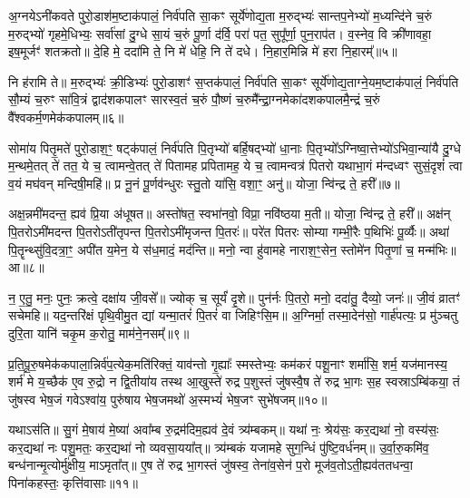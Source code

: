 {\anuvakamend[{व॒यं यद् विꣳ॑श॒तिश्च॑॥३॥}]}

अ॒ग्नये\-ऽनी॑कवते पुरो॒डाश॑म॒ष्टाक॑पालं॒ निर्व॑पति सा॒कꣳ सूर्ये॑णोद्य॒ता म॒रुद्भ्यः॑ सान्तप॒नेभ्यो॑ म॒ध्यन्दि॑ने च॒रुं म॒रुद्भ्यो॑ गृहमे॒धिभ्यः॒ सर्वा॑सां दु॒ग्धे सा॒यं च॒रुं पू॒र्णा द॑र्वि॒ परा॑ पत॒ सुपू᳚र्णा॒ पुन॒राप॑त। व॒स्नेव॒ वि क्री॑णावहा॒ इष॒मूर्जꣳ॑ शतक्रतो॥ दे॒हि मे॒ ददा॑मि ते॒ नि मे॑ धेहि॒ नि ते॑ दधे। नि॒हार॒मिन्नि मे॑ हरा नि॒हारम्᳚॥५॥


नि ह॑रामि ते॥ म॒रुद्भ्यः॑ क्री॒डिभ्यः॑ पुरो॒डाशꣳ॑ स॒प्तक॑पालं॒ निर्व॑पति सा॒कꣳ सूर्ये॑णोद्य॒ताग्ने॒यम॒ष्टाक॑पालं॒ निर्व॑पति सौ॒म्यं च॒रुꣳ सा॑वि॒त्रं द्वाद॑शकपालꣳ सारस्व॒तं च॒रुं पौ॒ष्णं च॒रुमै᳚न्द्रा॒ग्नमेका॑दशकपालमै॒न्द्रं च॒रुं वै᳚श्वकर्म॒णमेक॑कपालम्॥६॥

{\anuvakamend[{ह॒रा॒ नि॒हारं॑ त्रि॒ꣳ॒शच्च॑॥४॥}]}

सोमा॑य पितृ॒मते॑ पुरो॒डाश॒ꣳ॒ षट्क॑पालं॒ निर्व॑पति पि॒तृभ्यो॑ बर्\mbox{}हि॒षद्भ्यो॑ धा॒नाः पि॒तृभ्यो᳚\-ऽग्निष्वा॒त्तेभ्यो॑\-ऽभिवा॒न्या॑यै दु॒ग्धे म॒न्थमे॒तत् ते॑ तत॒ ये च॒ त्वामन्वे॒तत् ते॑ पितामह प्रपितामह॒ ये च॒ त्वामन्वत्र॑ पितरो यथाभा॒गं म॑न्दध्वꣳ सुसं॒दृशं॑ त्वा व॒यं मघ॑वन् मन्दिषी॒महि॑॥ प्र नू॒नं पू॒र्णव॑न्धुरः स्तु॒तो या॑सि॒ वशा॒ꣳ॒ अनु॑॥ योजा॒ न्वि॑न्द्र ते॒ हरी᳚॥७॥

अक्ष॒न्नमी॑मदन्त॒ ह्यव॑ प्रि॒या अ॑धूषत॥ अस्तो॑षत॒ स्वभा॑नवो॒ विप्रा॒ नवि॑ष्ठया म॒ती॥ योजा॒ न्वि॑न्द्र ते॒ हरी᳚॥ अक्ष॑न् पि॒तरो\-ऽमी॑मदन्त पि॒तरो\-ऽती॑तृपन्त पि॒तरो\-ऽमी॑मृजन्त पि॒तरः॑॥ परे॑त पितरः सोम्या गम्भी॒रैः प॒थिभिः॑ पू॒र्व्यैः॥ अथा॑ पि॒तॄन्थ्सु॑वि॒दत्रा॒ꣳ॒ अपी॑त य॒मेन॒ ये स॑ध॒मादं॒ मद॑न्ति॥ मनो॒ न्वा हु॑वामहे नाराश॒ꣳ॒सेन॒ स्तोमे॑न पितृ॒णां च॒ मन्म॑भिः॥ आ॥८॥

न॒ ए॒तु॒ मनः॒ पुनः॒ क्रत्वे॒ दक्षा॑य जी॒वसे᳚॥ ज्योक् च॒ सूर्यं॑ दृ॒शे॥ पुन॑र्नः पि॒तरो॒ मनो॒ ददा॑तु॒ दैव्यो॒ जनः॑॥ जी॒वं व्रातꣳ॑ सचेमहि॥ यद॒न्तरि॑क्षं पृथि॒वीमु॒त द्यां यन्मा॒तरं॑ पि॒तरं॑ वा जिहिꣳसि॒म॥ अ॒ग्निर्मा॒ तस्मा॒देन॑सो॒ गार्\mbox{}ह॑पत्यः॒ प्र मु॑ञ्चतु दुरि॒ता यानि॑ चकृ॒म क॒रोतु॒ माम॑ने॒नसम्᳚॥९॥

{\anuvakamend[{हरी॒ मन्म॑भि॒रा चतु॑श्चत्वारिꣳशच्च॥५॥}]}

प्र॒ति॒पू॒रु॒षमेक॑कपाला॒न्निर्व॑प॒त्येक॒मति॑रिक्तं॒ याव॑न्तो गृ॒ह्याः᳚ स्मस्तेभ्यः॒ कम॑करं पशू॒नाꣳ शर्मा॑सि॒ शर्म॒ यज॑मानस्य॒ शर्म॑ मे य॒च्छैक॑ ए॒व रु॒द्रो न द्वि॒तीया॑य तस्थ आ॒खुस्ते॑ रुद्र प॒शुस्तं जु॑षस्वै॒ष ते॑ रुद्र भा॒गः स॒ह स्वस्रा\-ऽम्बि॑कया॒ तं जु॑षस्व भेष॒जं गवे\-ऽश्वा॑य॒ पुरु॑षाय भेष॒जमथो॑ अ॒स्मभ्यं॑ भेष॒जꣳ सुभे॑षजम्॥१०॥

यथा\-ऽस॑ति॥ सु॒गं मे॒षाय॑ मे॒ष्या॑ अवा᳚म्ब रु॒द्रम॑दिम॒ह्यव॑ दे॒वं त्र्य॑म्बकम्॥ यथा॑ नः॒ श्रेय॑सः॒ कर॒द्यथा॑ नो॒ वस्य॑सः॒ कर॒द्यथा॑ नः पशु॒मतः॒ कर॒द्यथा॑ नो व्यवसा॒यया᳚त्॥ त्र्य॑म्बकं यजामहे सुग॒न्धिं पु॑ष्टि॒वर्ध॑नम्॥ उ॒र्वा॒रु॒कमि॑व॒ बन्ध॑नान्मृ॒त्योर्मु॑क्षीय॒ मा\-ऽमृता᳚त्॥ ए॒ष ते॑ रुद्र भा॒गस्तं जु॑षस्व॒ तेना॑व॒सेन॑ प॒रो मूज॑व॒तो\-ऽती॒ह्यव॑ततधन्वा॒ पिना॑कहस्तः॒ कृत्ति॑वासाः॥११॥

